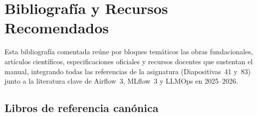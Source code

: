 
\chapter[Bibliografía y Recursos]{Bibliografía y Recursos Recomendados}\label{app:bibliografia}

Esta bibliografía comentada reúne por bloques temáticos las obras fundacionales, artículos científicos, especificaciones oficiales y recursos docentes que sustentan el manual, integrando todas las referencias de la asignatura (Diapositivas~41 y~83) junto a la literatura clave de Airflow~3, MLflow~3 y LLMOps en 2025--2026.

\section{Libros de referencia canónica}\label{sec:bib-libros}

